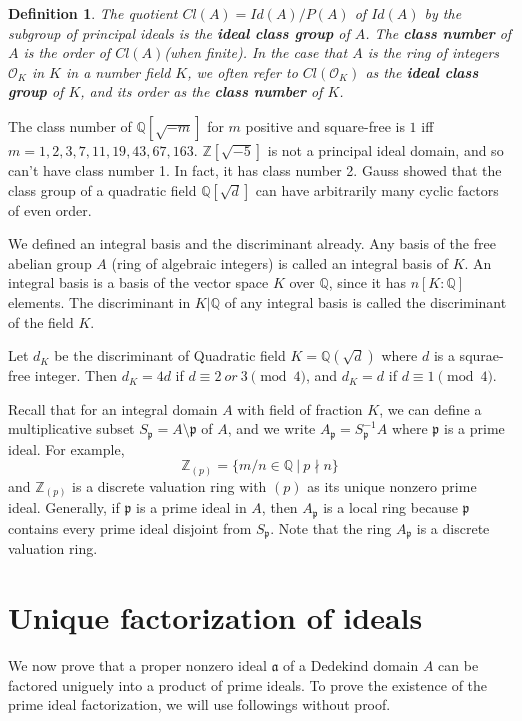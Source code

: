 \documentclass[11pt,a4paper,reqno]{amsart}
\numberwithin{equation}{section}
\newtheorem{defn}[thm]{Definition}
\begin{document}
\begin{defn}
The quotient $Cl(A)=Id(A)/P(A)$ of $Id(A)$ by the subgroup of principal ideals is the \textbf{ideal class group} of $A$.
The \textbf{class number} of $A$ is the order of $Cl(A)$(when finite). 
In the case that $A$ is the ring of integers $\mathcal{O}_K$ in $K$ in a number field $K$, 
we often refer to $Cl({\mathcal{O}_K})$ as the \textbf{ideal class group} of $K$, 
and its order as the \textbf{class number} of $K$.
\end{defn}

The class number of $\mathbb{Q}[\sqrt{-m}]$ for $m$ positive and square-free is $1$ iff $m=1,2,3,7,11,19,43,67,163$.
$\mathbb{Z}[\sqrt{-5}]$ is not a principal ideal domain, and so can't have class number 1. 
In fact, it has class number 2.
Gauss showed that the class group of a quadratic field $\mathbb{Q}[\sqrt{d}]$ can have arbitrarily many cyclic factors of even order.

We defined an integral basis and the discriminant already. 
Any basis of the free abelian group $A$ (ring of algebraic integers) is called an integral basis of $K$. 
An integral basis is a basis of the vector space $K$ over $\mathbb{Q}$, since it has $n[K:\mathbb{Q}]$ elements.
The discriminant in $K|\mathbb{Q}$ of any integral basis is called the discriminant of the field $K$.

Let $d_K$ be the discriminant  of Quadratic field $K=\mathbb{Q}(\sqrt{d})$ where $d$ is a squrae-free integer.
Then $d_K = 4d$ if $d \equiv 2~or~3 \pmod 4$, and $d_K = d$ if $d \equiv 1  \pmod 4$.

Recall that for an integral domain $A$ with field of fraction $K$, 
we can define a multiplicative subset ${S_\mathfrak{p}}=A\setminus{\mathfrak{p}}$ of $A$, and 
we write ${A_\mathfrak{p}}={S^{-1}_{\mathfrak{p}}}A$ where $\mathfrak{p}$ is a prime ideal. For example, 
\[
{\mathbb{Z}_{(p)}}=\{m/n\in{\mathbb{Q}}~|~p\nmid n \}
\]
and $\mathbb{Z}_(p)$ is a discrete valuation ring with $(p)$ as its unique nonzero prime ideal.
Generally, if $\mathfrak{p}$ is a prime ideal in $A$, then $A_{\mathfrak{p}}$ is a local ring 
because $\mathfrak{p}$ contains every prime ideal disjoint from $S_{\mathfrak{p}}$.
Note that the ring $A_\mathfrak{p}$ is a discrete valuation ring.

\section{Unique factorization of ideals}

We now prove that a proper nonzero ideal $\mathfrak{a}$ of a Dedekind domain $A$ can be factored uniguely into a product of prime ideals.
To prove the existence of the prime ideal factorization, we will use followings without proof.
\end{document}
